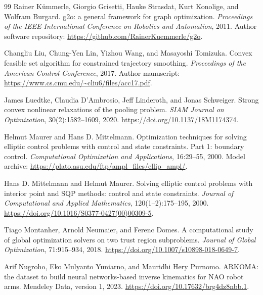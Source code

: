 \documentclass[pdflatex,sn-mathphys-num]{sn-jnl}
\theoremstyle{thmstyleone}
\theoremstyle{thmstylethree}
\newcounter{algorithm}
\begin{document}
\begin{thebibliography}{99}
Rainer K\"ummerle, Giorgio Grisetti, Hauke Strasdat, Kurt Konolige, and Wolfram Burgard.
\newblock g2o: a general framework for graph optimization.
\newblock \emph{Proceedings of the IEEE International Conference on Robotics and Automation}, 2011.
\newblock Author software repository: \url{https://github.com/RainerKuemmerle/g2o}.

Changliu Liu, Chung-Yen Lin, Yizhou Wang, and Masayoshi Tomizuka.
\newblock Convex feasible set algorithm for constrained trajectory smoothing.
\newblock \emph{Proceedings of the American Control Conference}, 2017.
\newblock Author manuscript: \url{https://www.cs.cmu.edu/~cliu6/files/acc17.pdf}.

James Luedtke, Claudia D'Ambrosio, Jeff Linderoth, and Jonas Schweiger.
\newblock Strong convex nonlinear relaxations of the pooling problem.
\newblock \emph{SIAM Journal on Optimization}, 30(2):1582--1609, 2020.
\newblock \url{https://doi.org/10.1137/18M1174374}.

Helmut Maurer and Hans D. Mittelmann.
\newblock Optimization techniques for solving elliptic control problems with control and state constraints. Part 1: boundary control.
\newblock \emph{Computational Optimization and Applications}, 16:29--55, 2000.
\newblock Model archive: \url{https://plato.asu.edu/ftp/ampl_files/ellip_ampl/}.

Hans D. Mittelmann and Helmut Maurer.
\newblock Solving elliptic control problems with interior point and SQP methods: control and state constraints.
\newblock \emph{Journal of Computational and Applied Mathematics}, 120(1--2):175--195, 2000.
\newblock \url{https://doi.org/10.1016/S0377-0427(00)00309-5}.

Tiago Montanher, Arnold Neumaier, and Ferenc Domes.
\newblock A computational study of global optimization solvers on two trust region subproblems.
\newblock \emph{Journal of Global Optimization}, 71:915--934, 2018.
\newblock \url{https://doi.org/10.1007/s10898-018-0649-7}.

Arif Nugroho, Eko Mulyanto Yuniarno, and Mauridhi Hery Purnomo.
\newblock ARKOMA: the dataset to build neural networks-based inverse kinematics for NAO robot arms.
\newblock Mendeley Data, version 1, 2023.
\newblock \url{https://doi.org/10.17632/brg4dz8nbb.1}.


\end{thebibliography}
\end{document}
